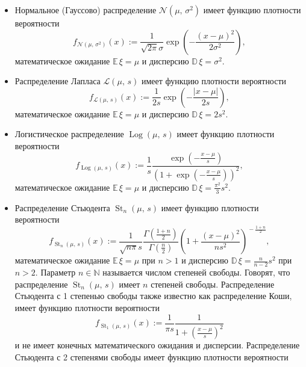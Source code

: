 \documentclass[12pt,a4paper]{article}
\newcommand{\naturals}{\mathbb{N}}
\newcommand{\expectation}{\mathbb{E}}
\newcommand{\dispersion}{\mathbb{D}}
\newcommand{\normallaw}{\mathcal{N}}
\newcommand{\Laplacelaw}{\mathcal{L}}
\newcommand{\logisticlaw}{\operatorname{Log}}
\newcommand{\Studentlaw}{\operatorname{St}}
\begin{document}
	\begin{itemize}
		\item Нормальное (Гауссово) распределение $\normallaw(\mu,\,\sigma^2)$ имеет функцию плотности вероятности
		\begin{equation*}
			f_{\normallaw(\mu,\,\sigma^2)}(x) := \frac{1}{\sqrt{2\pi}\sigma} \exp\left(-\frac{(x-\mu)^2}{2\sigma^2}\right)\!,
		\end{equation*}
		математическое ожидание $\expectation\,\xi = \mu$ и дисперсию $\dispersion\,\xi = \sigma^2$.
		\item Распределение Лапласа $\Laplacelaw(\mu,\,s)$ имеет функцию плотности вероятности
		\begin{equation*}
			f_{\Laplacelaw(\mu,\,s)}(x) := \frac{1}{2s} \exp\left(-\frac{|x-\mu|}{2s}\right)\!,
		\end{equation*}
		математическое ожидание $\expectation\,\xi = \mu$ и дисперсию $\dispersion\,\xi = 2s^2$.
		\item Логистическое распределение $\logisticlaw(\mu,\,s)$ имеет функцию плотности вероятности
		\begin{equation*}
			f_{\logisticlaw(\mu,\,s)}(x) := \frac1s \frac { \exp\left(-\frac{x-\mu}{s}\right) } { \left(1+\exp\left(-\frac{x-\mu}{s}\right)\right)^2 },
		\end{equation*}
		математическое ожидание $\expectation\,\xi = \mu$ и дисперсию $\dispersion\,\xi = \frac{\pi^2}{3} s^2$.
		\item Распределение Стьюдента $\Studentlaw_n(\mu,\,s)$ имеет функцию плотности вероятности
		\begin{equation*}
			f_{\Studentlaw_n(\mu,\,s)}(x) := \frac{1}{\sqrt{n\pi}s} \frac{\Gamma\left(\frac{1+n}{2}\right)}{\Gamma\left(\frac{n}{2}\right)} \left(1+\frac{(x-\mu)^2}{ns^2}\right)^{\!-\frac{1+n}{2}}\!,
		\end{equation*}
		математическое ожидание $\expectation\,\xi = \mu$ при $n > 1$ и дисперсию $\dispersion\,\xi = \frac{n}{n-2} s^2$ при $n > 2$. Параметр $n \in \naturals$ называется числом степеней свободы. Говорят, что распределение $\Studentlaw_n(\mu,\,s)$ имеет $n$ степеней свободы. Распределение Стьюдента с 1 степенью свободы также известно как распределение Коши, имеет функцию плотности вероятности
		\begin{equation*}
			f_{\Studentlaw_1(\mu,\,s)}(x) := \frac{1}{\pi s} \frac {1} { 1 + \left(\frac{x-\mu}{s}\right)^2 }
		\end{equation*}
		и не имеет конечных математического ожидания и дисперсии. Распределение Стьюдента с 2 степенями свободы имеет функцию плотности вероятности

\end{itemize}
\end{document}
